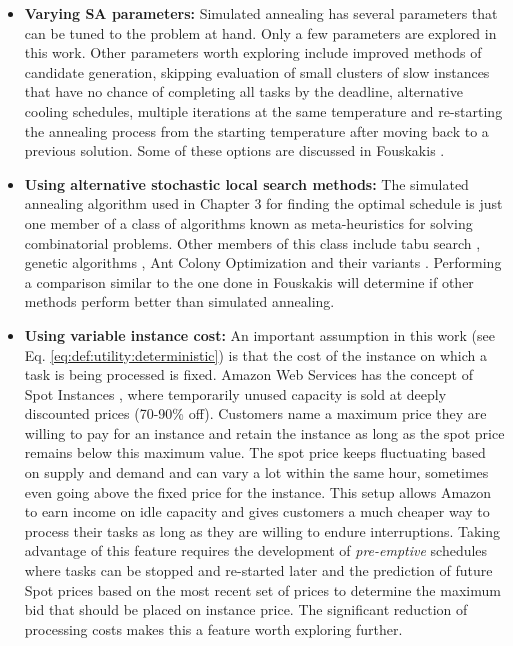 \documentclass[12pt]{report}
\begin{document}
\begin{itemize}

	\item \textbf{Varying SA parameters:} Simulated annealing has several parameters that can be tuned to the problem at hand.
	Only a few parameters are explored in this work.
	Other parameters worth exploring include improved methods of candidate generation, skipping evaluation of small clusters of slow instances that have no chance of completing all tasks by the deadline, alternative cooling schedules, multiple iterations at the same temperature and re-starting the annealing process from the starting temperature after moving back to a previous solution. 
	Some of these options are discussed in Fouskakis \cite{Fouskakis2001}.
	
	\item \textbf{Using alternative stochastic local search methods:} 
	The simulated annealing algorithm \cite{Kirkpatrick1983} used in Chapter 3 for finding the optimal schedule is just one member of a class of algorithms known as meta-heuristics for solving combinatorial problems.
	Other members of this class include tabu search \cite{Glover1989, Glover1990}, genetic algorithms \cite{Holland1992}, Ant Colony Optimization \cite{Dorigo2006} and their variants \cite{Hoos2004}.
	Performing a comparison similar to the one done in Fouskakis \cite{Fouskakis2001} will determine if other methods perform better than simulated annealing.
	
	\item \textbf{Using variable instance cost:} An important assumption in this work (see Eq. \ref{eq:def:utility:deterministic}) is that the cost of the instance on which a task is being processed is fixed.
		Amazon Web Services has the concept of Spot Instances \cite{AWS:Spot}, where temporarily unused capacity is sold at deeply discounted prices (70-90\% off). 
		Customers name a maximum price they are willing to pay for an instance and retain the instance as long as the spot price remains below this maximum value.
		The spot price keeps fluctuating based on supply and demand and can vary a lot within the same hour, sometimes even going above the fixed price for the instance.
		This setup allows Amazon to earn income on idle capacity and gives customers a much cheaper way to process their tasks as long as they are willing to endure interruptions.
		Taking advantage of this feature requires the development of \textit{pre-emptive} schedules where tasks can be stopped and re-started later and the prediction of future Spot prices based on the most recent set of prices to determine the maximum bid that should be placed on instance price.
		The significant reduction of processing costs makes this a feature worth exploring further.
	
\end{itemize}


\newpage
\sloppy
\printbibliography

\appendix

\end{document}
